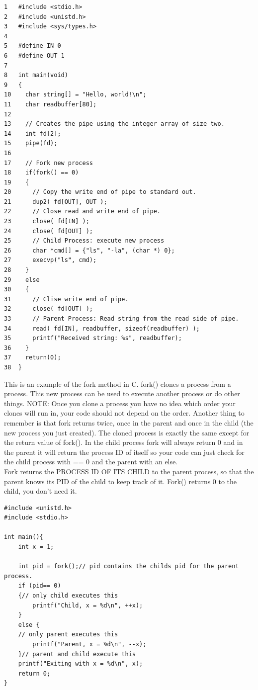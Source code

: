\newpage

\begin{lstlisting}
1	#include <stdio.h>
2	#include <unistd.h>
3	#include <sys/types.h>
4	
5	#define IN 0
6	#define OUT 1
7	
8	int main(void)
9	{
10	  char string[] = "Hello, world!\n";
11	  char readbuffer[80];
12	
13	  // Creates the pipe using the integer array of size two.
14	  int fd[2];
15	  pipe(fd);
16	
17	  // Fork new process
18	  if(fork() == 0)
19	  {
20	    // Copy the write end of pipe to standard out.
21	    dup2( fd[OUT], OUT );
22	    // Close read and write end of pipe.
23	    close( fd[IN] );
24	    close( fd[OUT] );
25	    // Child Process: execute new process
26	    char *cmd[] = {"ls", "-la", (char *) 0};
27	    execvp("ls", cmd);
28	  }
29	  else
30	  {
31	    // Clise write end of pipe.
32	    close( fd[OUT] );
33	    // Parent Process: Read string from the read side of pipe.
34	    read( fd[IN], readbuffer, sizeof(readbuffer) );
35	    printf("Received string: %s", readbuffer);
36	  }
37	  return(0);
38	}
\end{lstlisting}

 \newpage
{}

This is an example of the fork method in C.  fork() clones a process from a process.  This new process can be used to execute another process or
do other things.  NOTE:  Once you clone a process you have no idea which order your clones will run in, your code should not depend on the order.  Another thing to remember is that fork returns twice, once in the parent and once in the child (the new process you just created).  The cloned process is exactly the same except for the return value of fork().  In the child process fork will always return 0 and in the parent it will return the process ID of itself so your code can just check for the child process with == 0 and the parent with an else.\\

Fork returns the PROCESS ID OF ITS CHILD to the parent process, so that the parent knows its PID of the child to keep track of it.  Fork() returns 0 to the child, you don't need it.
\begin{lstlisting}
#include <unistd.h>
#include <stdio.h>

int main(){
	int x = 1;
	
	int pid = fork();// pid contains the childs pid for the parent process.
	if (pid== 0) 
	{// only child executes this
		printf("Child, x = %d\n", ++x);
	} 
	else {
	// only parent executes this
		printf("Parent, x = %d\n", --x);
	}// parent and child execute this
	printf("Exiting with x = %d\n", x);
	return 0;
}
\end{lstlisting}

